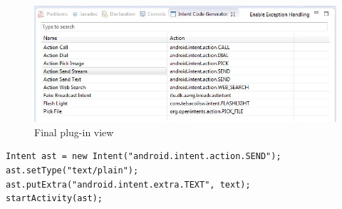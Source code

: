 \begin{figure}[t]
\label{codegeneratorview}
  \centering
    \includegraphics[width=\textwidth]{codegenerator}
  \caption{Final plug-in view}
\end{figure}

{\footnotesize\begin{lstlisting}[label=generatedCode,caption=Generated code of an Intent]
Intent ast = new Intent("android.intent.action.SEND");
ast.setType("text/plain");
ast.putExtra("android.intent.extra.TEXT", text);
startActivity(ast);		
\end{lstlisting}}